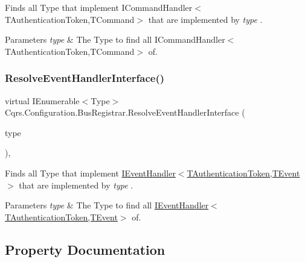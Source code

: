 Finds all Type that implement I\+Command\+Handler$<$\+T\+Authentication\+Token,\+T\+Command$>$ that are implemented by {\itshape type} . 


\begin{DoxyParams}{Parameters}
{\em type} & The Type to find all I\+Command\+Handler$<$\+T\+Authentication\+Token,\+T\+Command$>$ of.\\
\hline
\end{DoxyParams}
\mbox{\label{classCqrs_1_1Configuration_1_1BusRegistrar_a0af1844a5f7f1c4adfde2499b054aaae_a0af1844a5f7f1c4adfde2499b054aaae}} 
\subsubsection{\texorpdfstring{Resolve\+Event\+Handler\+Interface()}{ResolveEventHandlerInterface()}}
{\footnotesize\ttfamily virtual I\+Enumerable$<$Type$>$ Cqrs.\+Configuration.\+Bus\+Registrar.\+Resolve\+Event\+Handler\+Interface (\begin{DoxyParamCaption}\item[{Type}]{type }\end{DoxyParamCaption})\hspace{0.3cm}{\ttfamily [protected]}, {\ttfamily [virtual]}}



Finds all Type that implement \hyperlink{interfaceCqrs_1_1Events_1_1IEventHandler}{I\+Event\+Handler$<$\+T\+Authentication\+Token,\+T\+Event$>$} that are implemented by {\itshape type} . 


\begin{DoxyParams}{Parameters}
{\em type} & The Type to find all \hyperlink{interfaceCqrs_1_1Events_1_1IEventHandler}{I\+Event\+Handler$<$\+T\+Authentication\+Token,\+T\+Event$>$} of.\\
\hline
\end{DoxyParams}


\subsection{Property Documentation}
\mbox{\label{classCqrs_1_1Configuration_1_1BusRegistrar_aafccd565c2d9a748ff0f850a94100399_aafccd565c2d9a748ff0f850a94100399}} 
